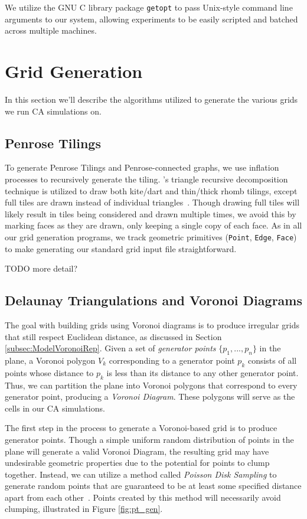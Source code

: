 \documentclass[a4paper,11pt,twoside]{report}
\begin{document}
We utilize the GNU C library package \texttt{getopt} to pass Unix-style command line arguments to our system, allowing experiments to be easily scripted and batched across multiple machines.

\section{Grid Generation}
\label{sec:GridGen}

In this section we'll describe the algorithms utilized to generate the various grids we run CA simulations on.

\subsection{Penrose Tilings}
To generate Penrose Tilings and Penrose-connected graphs, we use inflation processes to recursively generate the tiling. \citeauthor{ro71}'s triangle recursive decomposition technique is utilized to draw both kite/dart and thin/thick rhomb tilings, except full tiles are drawn instead of individual triangles~\cite{ro71}. Though drawing full tiles will likely result in tiles being considered and drawn multiple times, we avoid this by marking faces as they are drawn, only keeping a single copy of each face. As in all our grid generation programs, we track geometric primitives (\texttt{Point}, \texttt{Edge}, \texttt{Face}) to make generating our standard grid input file straightforward.

TODO more detail?

\subsection{Delaunay Triangulations and Voronoi Diagrams}
The goal with building grids using Voronoi diagrams is to produce irregular grids that still respect Euclidean distance, as discussed in Section \ref{subsec:ModelVoronoiRep}. Given a set of \textit{generator points} $\{p_1, ..., p_n\}$ in the plane, a Voronoi polygon $V_k$ corresponding to a generator point $p_k$ consists of all points whose distance to $p_k$ is less than its distance to any other generator point. Thus, we can partition the plane into Voronoi polygons that correspond to every generator point, producing a \textit{Voronoi Diagram}. These polygons will serve as the cells in our CA simulations. 

The first step in the process to generate a Voronoi-based grid is to produce generator points. Though a simple uniform random distribution of points in the plane will generate a valid Voronoi Diagram, the resulting grid may have undesirable geometric properties due to the potential for points to clump together. Instead, we can utilize a method called \textit{Poisson Disk Sampling} to generate random points that are guaranteed to be at least some specified distance apart from each other~\cite{br07}. Points created by this method will necessarily avoid clumping, illustrated in Figure \ref{fig:pt_gen}.
\end{document}
